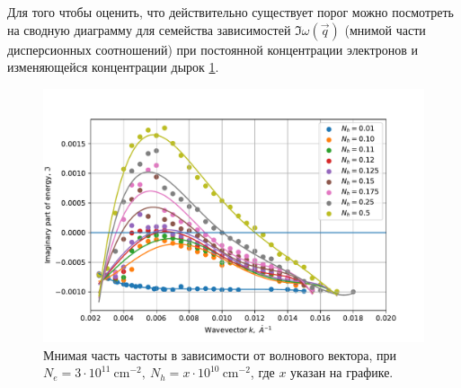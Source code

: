 \documentclass[../main.tex]{subfiles}
\begin{document}
    Для того чтобы оценить, что действительно существует порог можно посмотреть на сводную диаграмму для семейства зависимостей $\Im \omega(\vec q)$
    (мнимой части дисперсионных соотношений) при постоянной концентрации электронов и изменяющейся концентрации дырок \ref{plasmon:6nm3neXnpim}.

    \begin{figure}[h]
        \begin{minipage}[h]{1\textwidth}
            \includegraphics[width=1\textwidth]{./images/plazmon6nm3neXnpim.pdf}
            \caption{Мнимая часть частоты в зависимости от волнового вектора, при $N_e = 3 \cdot 10^{11}~\text{cm}^{-2},~N_h = x \cdot 10^{10}~\text{cm}^{-2}$,
            где $x$ указан на графике.\label{plasmon:6nm3neXnpim}}
        \end{minipage}
    \end{figure}
    
\end{document}
